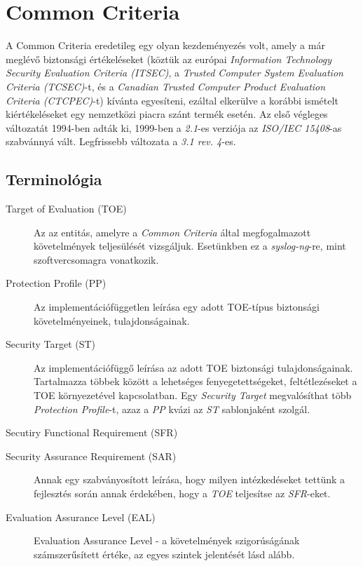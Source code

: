 \FloatBarrier

\section{Common Criteria}

A Common Criteria eredetileg egy olyan kezdeményezés volt, amely a már meglévő biztonsági
értékeléseket (köztük az európai \emph{Information Technology Security Evaluation Criteria (ITSEC)},
a \emph{Trusted Computer System Evaluation Criteria (TCSEC)}-t, és a
\emph{Canadian Trusted Computer Product Evaluation Criteria (CTCPEC)}-t) kívánta egyesíteni, ezáltal
elkerülve a korábbi ismételt kiértékeléseket egy nemzetközi piacra szánt termék esetén.  Az első
végleges változatát 1994-ben adták ki, 1999-ben a \emph{2.1}-es verziója az \emph{ISO/IEC 15408}-as
szabvánnyá vált. Legfrissebb változata a \emph{3.1 rev. 4}-es.

\subsection{Terminológia}

\begin{description}
    \item[Target of Evaluation (TOE)] {Az az entitás, amelyre a \emph{Common Criteria} által
        megfogalmazott követelmények teljesülését vizsgáljuk. Esetünkben ez a \emph{syslog-ng}-re,
        mint szoftvercsomagra vonatkozik.}
    \item[Protection Profile (PP)] { Az implementációfüggetlen leírása egy adott TOE-típus
        biztonsági követelményeinek, tulajdonságainak. }
    \item[Security Target (ST)] { Az implementációfüggő leírása az adott TOE biztonsági
        tulajdonságainak. Tartalmazza többek között a lehetséges fenyegetettségeket, feltétlezéseket
        a TOE környezetével kapcsolatban. Egy \emph{Security Target} megvalósíthat több
        \emph{Protection Profile}-t, azaz a \emph{PP} kvázi az \emph{ST} sablonjaként szolgál. }
    \item[Secutiry Functional Requirement (SFR)] { }
    \item[Security Assurance Requirement (SAR)] { Annak egy szabványosított leírása, hogy milyen
        intézkedéseket tettünk a fejlesztés során annak érdekében, hogy a \emph{TOE} teljesítse az
        \emph{SFR}-eket.}
    \item[Evaluation Assurance Level (EAL)]{Evaluation Assurance Level - a követelmények
        szigorúságának számszerűsített értéke, az egyes szintek jelentését lásd alább.}
\end{description}

